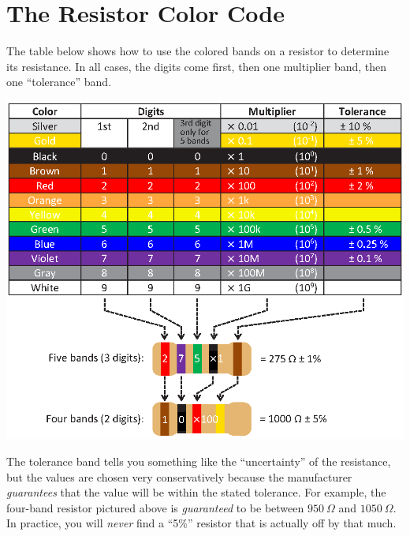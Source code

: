 \section{The Resistor Color Code}
\label{resistor_code}

The table below shows how to use the colored bands on a resistor to determine its resistance.  In all cases, the digits come first, then one multiplier band, then one ``tolerance'' band. 


{\centering \includegraphics{appendices/resistor_code/resistor_table.eps} \par}


The tolerance band tells you something like the ``uncertainty'' of the resistance, but the values are chosen very conservatively because the manufacturer \textit{guarantees} that the value will be within the stated tolerance.  For example, the four-band resistor pictured above is \textit{guaranteed} to be between $950~\Omega$ and $1050~\Omega$.  In practice, you will \textit{never} find a ``5\%'' resistor that is actually off by that much.


